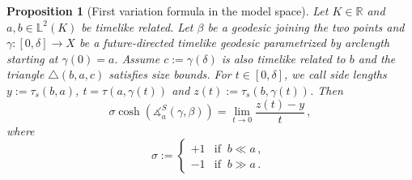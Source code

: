 \documentclass[11pt,reqno]{amsart}
\theoremstyle{definition}
\theoremstyle{definition}
\theoremstyle{plain}
\newtheorem{pop}[dfn]{Proposition}
\theoremstyle{remark}
\begin{document}
\begin{pop}[First variation formula in the model space]
\label{pop: First variation formula in the model space}
Let $K\in\mathbb R$ and $a,b \in \mathbb L^2(K)$ be timelike related. 
Let $\beta$ be a geodesic joining the two points and $\gamma:[0,\delta]\to X$ be a future-directed timelike geodesic parametrized by arclength starting at $\gamma(0)= a$. Assume $c:=\gamma(\delta)$ is also timelike related to $b$ and the triangle $\triangle (b,a,c)$ satisfies size bounds. For $t\in[0,\delta]$, we call side lengths $y:=\tau_s(b,a)$, $t=\tau(a,\gamma(t))$ and $z(t):=\tau_s(b,\gamma(t))$. Then
\begin{equation}\label{eq:constantfirstvariation}
\sigma\cosh(\measuredangle^S_a(\gamma,\beta))=\lim_{t\to0}\frac{z(t)-y}{t} \, ,
\end{equation}
where 
\[\sigma:=\begin{cases}
+1 & \text{if }\ b\ll a \, ,\\
-1 & \text{if }\ b\gg a \, .
\end{cases}\ \]
\end{pop}
\end{document}
